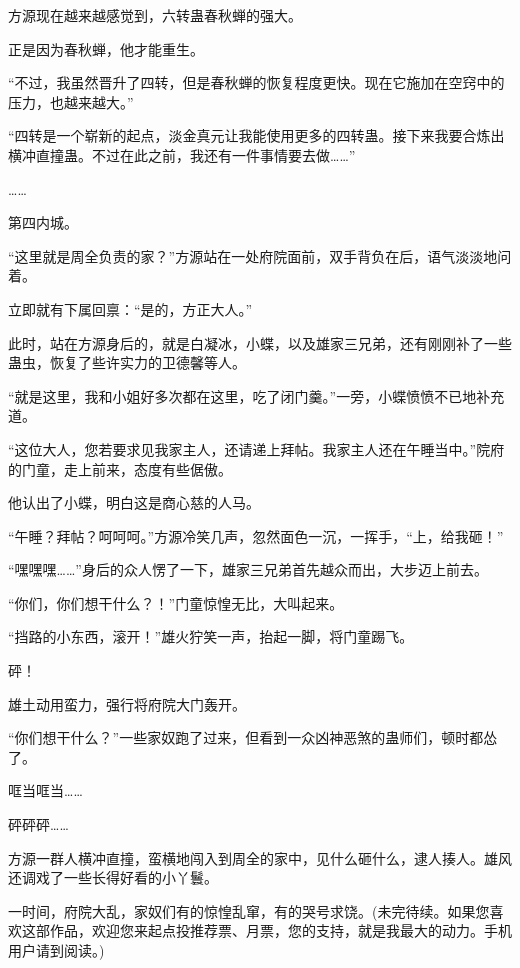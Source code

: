 \begin{this_body}
方源现在越来越感觉到，六转蛊春秋蝉的强大。

正是因为春秋蝉，他才能重生。

“不过，我虽然晋升了四转，但是春秋蝉的恢复程度更快。现在它施加在空窍中的压力，也越来越大。”

“四转是一个崭新的起点，淡金真元让我能使用更多的四转蛊。接下来我要合炼出横冲直撞蛊。不过在此之前，我还有一件事情要去做……”

……

第四内城。

“这里就是周全负责的家？”方源站在一处府院面前，双手背负在后，语气淡淡地问着。

立即就有下属回禀：“是的，方正大人。”

此时，站在方源身后的，就是白凝冰，小蝶，以及雄家三兄弟，还有刚刚补了一些蛊虫，恢复了些许实力的卫德馨等人。

“就是这里，我和小姐好多次都在这里，吃了闭门羹。”一旁，小蝶愤愤不已地补充道。

“这位大人，您若要求见我家主人，还请递上拜帖。我家主人还在午睡当中。”院府的门童，走上前来，态度有些倨傲。

他认出了小蝶，明白这是商心慈的人马。

“午睡？拜帖？呵呵呵。”方源冷笑几声，忽然面色一沉，一挥手，“上，给我砸！”

“嘿嘿嘿……”身后的众人愣了一下，雄家三兄弟首先越众而出，大步迈上前去。

“你们，你们想干什么？！”门童惊惶无比，大叫起来。

“挡路的小东西，滚开！”雄火狞笑一声，抬起一脚，将门童踢飞。

砰！

雄土动用蛮力，强行将府院大门轰开。

“你们想干什么？”一些家奴跑了过来，但看到一众凶神恶煞的蛊师们，顿时都怂了。

哐当哐当……

砰砰砰……

方源一群人横冲直撞，蛮横地闯入到周全的家中，见什么砸什么，逮人揍人。雄风还调戏了一些长得好看的小丫鬟。

一时间，府院大乱，家奴们有的惊惶乱窜，有的哭号求饶。(未完待续。如果您喜欢这部作品，欢迎您来起点投推荐票、月票，您的支持，就是我最大的动力。手机用户请到阅读。)

\end{this_body}

